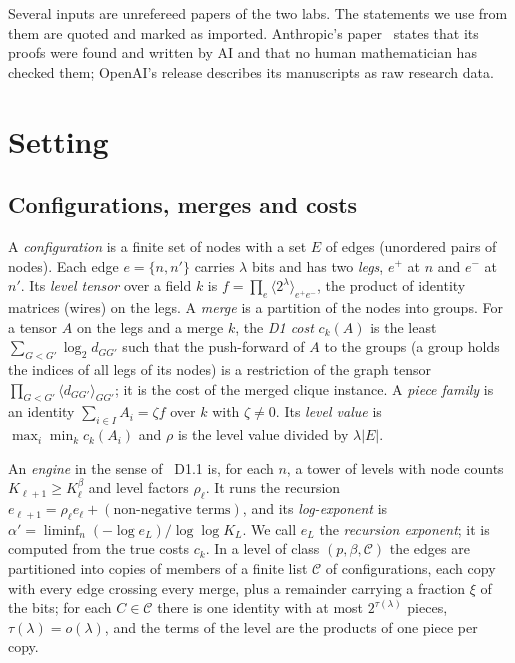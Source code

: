 \documentclass[10pt]{amsart}
\theoremstyle{plain}
\theoremstyle{definition}
\theoremstyle{remark}
\numberwithin{equation}{section}
\begin{document}
Several inputs are unrefereed papers of the two labs. The statements we use from
them are quoted and marked as imported. Anthropic's paper~\cite{AnthropicVP} states that its proofs
were found and written by AI and that no human mathematician has checked them; OpenAI's release
describes its manuscripts as raw research data.

\section{Setting}\label{sec:setting}

\subsection{Configurations, merges and costs}
A \emph{configuration} is a finite set of nodes with a set $E$ of edges (unordered pairs of nodes).
Each edge $e=\{n,n'\}$ carries $\lambda$ bits and has two \emph{legs}, $e^+$ at $n$ and $e^-$ at
$n'$. Its \emph{level tensor} over a field $k$ is $f=\prod_{e}\langle2^\lambda\rangle_{e^+e^-}$, the
product of identity matrices (wires) on the legs. A \emph{merge} is a partition of the nodes into
groups. For a tensor $A$ on the legs and a merge $k$, the \emph{D1 cost} $c_k(A)$ is the least
$\sum_{G<G'}\log_2 d_{GG'}$ such that the push-forward of $A$ to the groups (a group holds the
indices of all legs of its nodes) is a restriction of the graph tensor
$\prod_{G<G'}\langle d_{GG'}\rangle_{GG'}$; it is the cost of the merged clique instance. A
\emph{piece family} is an identity $\sum_{i\in I}A_i=\zeta f$ over $k$ with $\zeta\ne0$. Its
\emph{level value} is $\max_i\min_k c_k(A_i)$ and $\rho$ is the level value divided by $\lambda|E|$.

An \emph{engine} in the sense of ~D1.1 is, for each $n$, a tower of levels
with node counts $K_{\ell+1}\ge K_\ell^\beta$ and level factors $\rho_\ell$. It runs the recursion
$e_{\ell+1}=\rho_\ell e_\ell+(\text{non-negative terms})$, and its \emph{log-exponent} is
$\alpha'=\liminf_n(-\log e_L)/\log\log K_L$. We call $e_L$ the \emph{recursion exponent}; it is
computed from the true costs $c_k$. In a level of class $(p,\beta,\mathcal C)$ the edges are partitioned
into copies of members of a finite list $\mathcal C$ of configurations, each copy with every edge
crossing every merge, plus a remainder carrying a fraction $\xi$ of the bits; for each $C\in\mathcal C$
there is one identity with at most $2^{\tau(\lambda)}$ pieces, $\tau(\lambda)=o(\lambda)$, and the terms
of the level are the products of one piece per copy.
\end{document}
